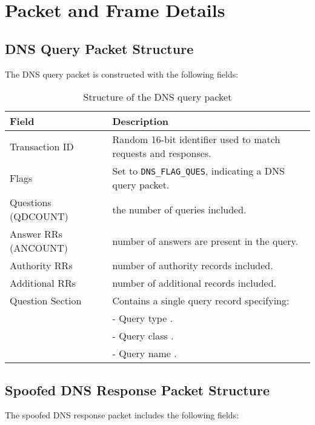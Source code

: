 \documentclass[12pt,a4paper]{article}
\begin{document}
\section{Packet and Frame Details}

\subsection{DNS Query Packet Structure}

The DNS query packet is constructed with the following fields\cite{cert-dns}:

\begin{table}[H]
\centering
\begin{tabular}{|l|p{8cm}|}
\hline
\textbf{Field} & \textbf{Description} \\
\hline
Transaction ID & Random 16-bit identifier  used to match requests and responses. \\
\hline
Flags & Set to \texttt{DNS\_FLAG\_QUES}, indicating a DNS query packet. \\
\hline
Questions (QDCOUNT) &  the number of queries included. \\
\hline
Answer RRs (ANCOUNT) &  number of answers are present in the query. \\
\hline
Authority RRs & number of authority records included. \\
\hline
Additional RRs & number of  additional records included. \\
\hline
Question Section & Contains a single query record specifying: \\
& \quad - Query type . \\
& \quad - Query class . \\
& \quad - Query name . \\
\hline
\end{tabular}
\caption{Structure of the DNS query packet}
\end{table}

\vspace{1em}

\subsection{Spoofed DNS Response Packet Structure}

The spoofed DNS response packet includes the following fields\cite{cert-dns}:
\end{document}
